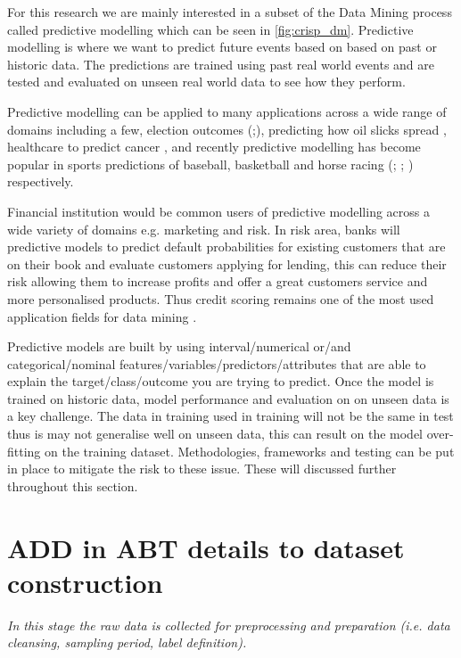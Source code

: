For this research we are mainly interested in a subset of the Data Mining process called predictive modelling which can be seen in \ref{fig:crisp_dm}. Predictive modelling is where we want to predict future events based on based on past or historic data. The predictions are trained using past real world events and are tested and evaluated on unseen real world data to see how they perform. 

Predictive modelling can be applied to many applications across a wide range of domains including a few, election outcomes (\citep{silver_signal_2012};\cite{tumasjan_predicting_2010}), predicting how oil slicks spread \citep{liu_tracking_2011}, healthcare to predict cancer \citep{delen_predicting_2005}, and recently predictive modelling has become popular in sports predictions of baseball, basketball and horse racing (\cite{lewis_moneyball_2004}; \cite{stekler_predicting_2012}; \cite{silverman_predicting_2013}) respectively. 
 

Financial institution would be common users of predictive modelling across a wide variety of domains e.g. marketing and risk. In risk area, banks will predictive models to predict default probabilities for existing customers that are on their book and evaluate customers applying for lending, this can reduce their risk allowing them to increase profits and offer a great customers service and more personalised products. Thus credit scoring remains one of the most used application fields for
data mining \citep{baesens_50_2009}.

Predictive models are built by using interval/numerical or/and categorical/nominal features/variables/predictors/attributes that are able to explain the target/class/outcome you are trying to predict. Once the model is trained on historic data, model performance and evaluation on on unseen data is a key challenge. The data in training used in training will not be the same in test thus is may not generalise well on unseen data, this can result on the model over-fitting on the training dataset. Methodologies, frameworks and testing can be put in place to mitigate the risk to these issue. These will discussed further throughout this section.


\section{ADD in ABT details to dataset construction}
\textit{In this stage the raw data is collected for preprocessing and preparation
(i.e. data cleansing, sampling period, label definition). \citep{kennedy_credit_2013}}

